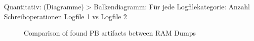 Quantitativ: (Diagramme)		
	> Balkendiagramm: Für jede Logfilekategorie: Anzahl Schreiboperationen Logfile 1 vs Logfile 2
	\begin{figure}[h!]
		\centerline{}
		\label{chart:final-criteria}  
		\caption{Comparison of found PB artifacts between RAM Dumps}
	\end{figure}



